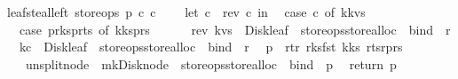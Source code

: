 \begin{isabellebody}
\isanewline
{\isachardoublequoteopen}leaf{\isacharunderscore}steal{\isacharunderscore}left\ store{\isacharunderscore}ops\ p\ c{}\ c{}\ {\isacharequal}\ {\isacharparenleft}\isanewline
\ \ let\ c{}\ {\isacharequal}\ rev\ c{}\ in\isanewline
\ \ case\ c{}\ of\ k{}{\isacharhash}kvs{}\ {\isasymRightarrow}\isanewline
\ \ case\ {\isacharparenleft}p{\isacharbar}{\isachargreater}r{\isacharunderscore}ks{}{\isacharcomma}p{\isacharbar}{\isachargreater}r{\isacharunderscore}ts{}{\isacharparenright}\ of\ {\isacharparenleft}k{}{\isacharhash}ks{}{\isacharcomma}{\isacharunderscore}{\isacharhash}p{\isacharunderscore}rs{}{\isacharparenright}\ {\isasymRightarrow}\ \ \ \isanewline
\ \ rev\ kvs{}\ {\isacharbar}{\isachargreater}\ Disk{\isacharunderscore}leaf\ {\isacharbar}{\isachargreater}\ {\isacharparenleft}store{\isacharunderscore}ops{\isacharbar}{\isachargreater}store{\isacharunderscore}alloc{\isacharparenright}\ {\isacharbar}{\isachargreater}\ bind\ {\isacharparenleft}{\isacharpercent}\ r{}{\isachardot}\isanewline
\ \ {\isacharparenleft}k{}{\isacharhash}c{}{\isacharparenright}\ {\isacharbar}{\isachargreater}\ Disk{\isacharunderscore}leaf\ {\isacharbar}{\isachargreater}\ {\isacharparenleft}store{\isacharunderscore}ops{\isacharbar}{\isachargreater}store{\isacharunderscore}alloc{\isacharparenright}\ {\isacharbar}{\isachargreater}\ bind\ {\isacharparenleft}{\isacharpercent}\ r{}{\isachardot}\isanewline
\ \ p\ {\isasymlparr}\ r{\isacharunderscore}t{\isacharcolon}{\isacharequal}r{}{\isacharcomma}\ r{\isacharunderscore}ks{}{\isacharcolon}{\isacharequal}{\isacharparenleft}fst\ k{}{\isacharparenright}{\isacharhash}ks{}{\isacharcomma}\ r{\isacharunderscore}ts{}{\isacharcolon}{\isacharequal}r{}{\isacharhash}p{\isacharunderscore}rs{}\ {\isasymrparr}\isanewline
\ \ {\isacharbar}{\isachargreater}\ unsplit{\isacharunderscore}node\ {\isacharbar}{\isachargreater}\ mk{\isacharunderscore}Disk{\isacharunderscore}node\ {\isacharbar}{\isachargreater}\ {\isacharparenleft}store{\isacharunderscore}ops{\isacharbar}{\isachargreater}store{\isacharunderscore}alloc{\isacharparenright}\ {\isacharbar}{\isachargreater}\ bind\ {\isacharparenleft}{\isacharpercent}\ p{\isachardot}\isanewline
\ \ return\ p{\isacharparenright}{\isacharparenright}{\isacharparenright}{\isacharparenright}{\isachardoublequoteclose}\isanewline

\end{isabellebody}
